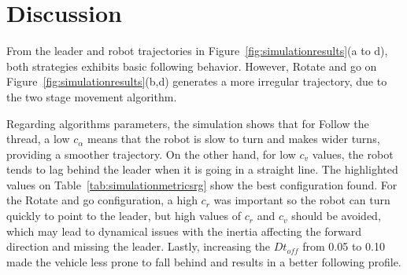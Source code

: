 \documentclass[journal]{IEEEtran}
\begin{document}
\section{Discussion}
\label{discussion}

From the leader and robot trajectories in Figure~\ref{fig:simulationresults}(a to d), both strategies exhibits basic following behavior.  However, Rotate and go on Figure~\ref{fig:simulationresults}(b,d) generates a more irregular trajectory, due to the two stage movement algorithm.   

Regarding algorithms parameters, the simulation shows that for Follow the thread, a low $c_{\alpha}$  means that the robot is slow to turn and makes wider turns, providing a smoother trajectory.  On the other hand, for low $c_v$ values, the robot tends to lag behind the leader when it is going in a straight line.  The highlighted values on Table~\ref{tab:simulationmetricsrg} show the best configuration found.  For the Rotate and go configuration, a high $c_r$ was important so the robot can turn quickly to point to the leader, but high values of $c_r$ and $c_v$ should be avoided, which may lead to dynamical issues with the inertia affecting the forward direction and missing the leader.  Lastly, increasing the $Dt_{off}$ from 0.05 to 0.10 made the vehicle less prone to fall behind and results in a better following profile.



\end{document}
